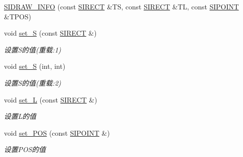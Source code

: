 \begin{DoxyCompactItemize}
\item 
\hyperlink{class_s_i_d_r_a_w___i_n_f_o_a48107d70e4071d1d925f722085876c3a}{S\+I\+D\+R\+A\+W\+\_\+\+I\+N\+FO} (const \hyperlink{struct_s_i_r_e_c_t}{S\+I\+R\+E\+CT} \&TS, const \hyperlink{struct_s_i_r_e_c_t}{S\+I\+R\+E\+CT} \&TL, const \hyperlink{struct_s_i_p_o_i_n_t}{S\+I\+P\+O\+I\+NT} \&T\+P\+OS)
\item 
\mbox{\label{class_s_i_d_r_a_w___i_n_f_o_aa4c9bdd6f914bc65d2900a9e6b5fa46e}} 
void \hyperlink{class_s_i_d_r_a_w___i_n_f_o_aa4c9bdd6f914bc65d2900a9e6b5fa46e}{set\+\_\+S} (const \hyperlink{struct_s_i_r_e_c_t}{S\+I\+R\+E\+CT} \&)
\begin{DoxyCompactList}\small\item\em 设置\+S的值(重载\+:1) \end{DoxyCompactList}\item 
\mbox{\label{class_s_i_d_r_a_w___i_n_f_o_ae3f97d9ad0701d3efe0bcda63b02c021}} 
void \hyperlink{class_s_i_d_r_a_w___i_n_f_o_ae3f97d9ad0701d3efe0bcda63b02c021}{set\+\_\+S} (int, int)
\begin{DoxyCompactList}\small\item\em 设置\+S的值(重载\+:2) \end{DoxyCompactList}\item 
\mbox{\label{class_s_i_d_r_a_w___i_n_f_o_ae70aee6b53f6bb4f52e8c70ea6094565}} 
void \hyperlink{class_s_i_d_r_a_w___i_n_f_o_ae70aee6b53f6bb4f52e8c70ea6094565}{set\+\_\+L} (const \hyperlink{struct_s_i_r_e_c_t}{S\+I\+R\+E\+CT} \&)
\begin{DoxyCompactList}\small\item\em 设置\+L的值 \end{DoxyCompactList}\item 
\mbox{\label{class_s_i_d_r_a_w___i_n_f_o_a6fb070443ef25d1de07bb98954df00a6}} 
void \hyperlink{class_s_i_d_r_a_w___i_n_f_o_a6fb070443ef25d1de07bb98954df00a6}{set\+\_\+\+P\+OS} (const \hyperlink{struct_s_i_p_o_i_n_t}{S\+I\+P\+O\+I\+NT} \&)
\begin{DoxyCompactList}\small\item\em 设置\+P\+O\+S的值 \end{DoxyCompactList}\item 

\end{DoxyCompactItemize}
